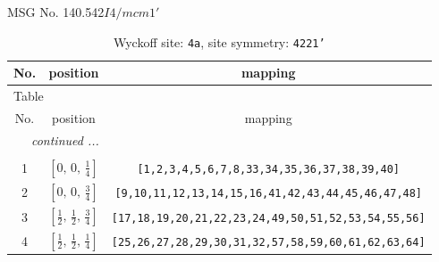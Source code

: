 \documentclass[fleqn,8pt]{jsarticle}
\begin{document}
\setcounter{MaxMatrixCols}{32}

\renewcommand{\tablename}{Table~}
\renewcommand{\figurename}{Figure~}
\begin{center}
\LARGE
MSG No. 140.542\quad$I4/mcm1'$
\end{center}
\renewcommand{\arraystretch}{1.2}
\begin{longtable}{ccc}
\caption{Wyckoff site: {\tt 4a}, site symmetry: {\tt 4221'}}
 \\
 \hline \hline
No. & position & mapping \\ \hline \endfirsthead

\multicolumn{2}{l}{\tablename\ \thetable{}} \\
 \hline \hline
No. & position & mapping \\ \hline \endhead

 \hline \hline
\multicolumn{2}{r}{\footnotesize\it continued ...} \\ \endfoot

 \hline \hline
\multicolumn{2}{r}{} \\ \endlastfoot

1 & $\left[ 0,\, 0,\, \frac{1}{4} \right]$ & {\tt [1,2,3,4,5,6,7,8,33,34,35,36,37,38,39,40]} \\ \hline
2 & $\left[ 0,\, 0,\, \frac{3}{4} \right]$ & {\tt [9,10,11,12,13,14,15,16,41,42,43,44,45,46,47,48]} \\ \hline
3 & $\left[ \frac{1}{2},\, \frac{1}{2},\, \frac{3}{4} \right]$ & {\tt [17,18,19,20,21,22,23,24,49,50,51,52,53,54,55,56]} \\ \hline
4 & $\left[ \frac{1}{2},\, \frac{1}{2},\, \frac{1}{4} \right]$ & {\tt [25,26,27,28,29,30,31,32,57,58,59,60,61,62,63,64]} \\
\end{longtable}
\renewcommand{\arraystretch}{1.2}
\end{document}
